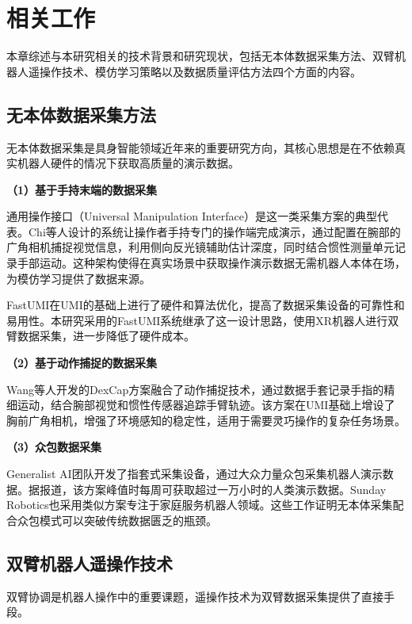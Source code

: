 \section{相关工作}

本章综述与本研究相关的技术背景和研究现状，包括无本体数据采集方法\cite{chi2024umi,wang2024dexcap}、双臂机器人遥操作技术\cite{zhao2023aloha,gello2023}、模仿学习策略\cite{argall2009survey,osa2018algorithmic}以及数据质量评估方法\cite{deminf2025,gretton2005hsic}四个方面的内容。

\subsection{无本体数据采集方法}

无本体数据采集是具身智能领域近年来的重要研究方向，其核心思想是在不依赖真实机器人硬件的情况下获取高质量的演示数据。

\textbf{（1）基于手持末端的数据采集}

通用操作接口（Universal Manipulation Interface）是这一类采集方案的典型代表。Chi等人\cite{chi2024umi}设计的系统让操作者手持专门的操作端完成演示，通过配置在腕部的广角相机捕捉视觉信息，利用侧向反光镜辅助估计深度，同时结合惯性测量单元记录手部运动。这种架构使得在真实场景中获取操作演示数据无需机器人本体在场，为模仿学习提供了数据来源。

FastUMI在UMI的基础上进行了硬件和算法优化，提高了数据采集设备的可靠性和易用性。本研究采用的FastUMI系统继承了这一设计思路，使用XR机器人进行双臂数据采集，进一步降低了硬件成本。

\textbf{（2）基于动作捕捉的数据采集}

Wang等人\cite{wang2024dexcap}开发的DexCap方案融合了动作捕捉技术，通过数据手套记录手指的精细运动，结合腕部视觉和惯性传感器追踪手臂轨迹。该方案在UMI基础上增设了胸前广角相机，增强了环境感知的稳定性，适用于需要灵巧操作的复杂任务场景。

\textbf{（3）众包数据采集}

Generalist AI团队开发了指套式采集设备，通过大众力量众包采集机器人演示数据。据报道，该方案峰值时每周可获取超过一万小时的人类演示数据。Sunday Robotics也采用类似方案专注于家庭服务机器人领域。这些工作证明无本体采集配合众包模式可以突破传统数据匮乏的瓶颈。

\subsection{双臂机器人遥操作技术}

双臂协调是机器人操作中的重要课题，遥操作技术为双臂数据采集提供了直接手段。

